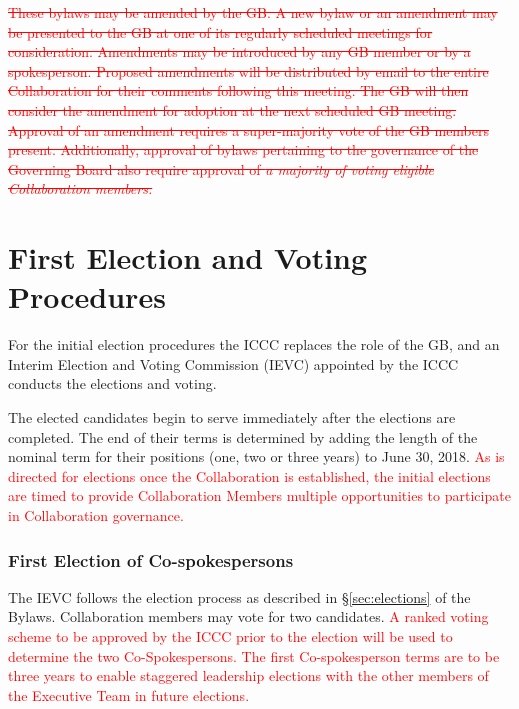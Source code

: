 \documentclass[12pt]{article}
\begin{document}
\textcolor{red} {\sout{
These bylaws may be amended by the GB. A new bylaw or an amendment may be presented to the GB at one of its regularly scheduled meetings for consideration. Amendments may be introduced by any GB member or by a spokesperson. Proposed amendments will be distributed by email to the entire Collaboration for their comments following this meeting. The GB will then consider the amendment for adoption at the next scheduled GB meeting. Approval of an amendment requires a super-majority vote of the GB members present. Additionally, approval of bylaws pertaining to the governance of the Governing Board also require approval of  {\it a majority of voting eligible Collaboration members.}
}}




\appendix
\appendixpage
\addappheadtotoc  %



\section{First Election and Voting Procedures}
\label{app:first_election}

For the initial election procedures the ICCC replaces the role of the GB, and an Interim Election and Voting Commission (IEVC) appointed by the ICCC conducts the elections and voting.  

The elected candidates begin to serve immediately after the elections are completed. The end of their terms is determined by adding the length of the nominal term for their positions (one, two or three years) to June 30, 2018. 
\textcolor{red}{As is directed for elections once the Collaboration is established, the initial elections are timed to provide Collaboration Members multiple opportunities to participate in Collaboration governance. }

\subsubsection{First Election of Co-spokespersons} 
The IEVC follows the election process as described in \S\ref{sec:elections} of the Bylaws.  Collaboration members may vote for two candidates.  \textcolor{red}{A ranked voting scheme to be approved by the ICCC prior to the election will be used to determine the two Co-Spokespersons. 
The first Co-spokesperson terms are to be three years to enable staggered leadership elections with the other members of the Executive Team in future elections. }
\end{document}
